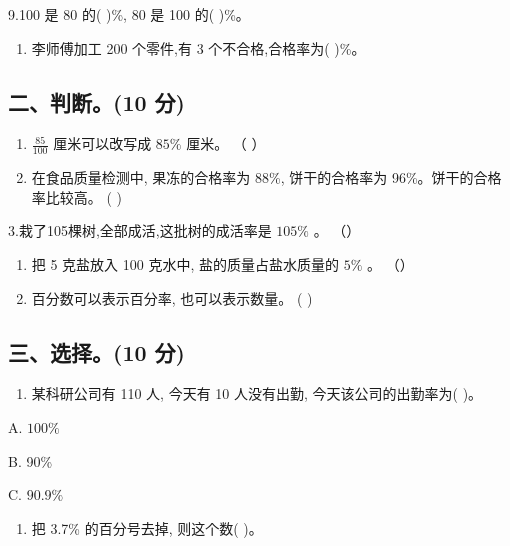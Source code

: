 \documentclass[
  10
]{article}
\providecommand{\tightlist}{%
  \setlength{\itemsep}{0pt}\setlength{\parskip}{0pt}}
\begin{document}
9.100 是 80 的( )\%, 80 是 100 的( )\%。

\begin{enumerate}
\def\labelenumi{\arabic{enumi}.}
\setcounter{enumi}{9}
\tightlist
\item
  李师傅加工 200 个零件,有 3 个不合格,合格率为( )\%。
\end{enumerate}

\subsection{二、判断。(10 分)}\label{ux4e8cux5224ux65ad10-ux5206}

\begin{enumerate}
\def\labelenumi{\arabic{enumi}.}
\item
  \(\frac{85}{100}\) 厘米可以改写成 \(85 \%\) 厘米。 （ ）
\item
  在食品质量检测中, 果冻的合格率为 88\%, 饼干的合格率为
  96\%。饼干的合格率比较高。 ( )
\end{enumerate}

3.栽了105棵树,全部成活,这批树的成活率是 \(105\%\) 。 （）

\begin{enumerate}
\def\labelenumi{\arabic{enumi}.}
\setcounter{enumi}{3}
\item
  把 5 克盐放入 100 克水中, 盐的质量占盐水质量的 \(5 \%\) 。 （）
\item
  百分数可以表示百分率, 也可以表示数量。 ( )
\end{enumerate}

\subsection{三、选择。(10 分)}\label{ux4e09ux9009ux62e910-ux5206}

\begin{enumerate}
\def\labelenumi{\arabic{enumi}.}
\tightlist
\item
  某科研公司有 110 人, 今天有 10 人没有出勤, 今天该公司的出勤率为( )。
\end{enumerate}

A. \(100\%\)

B. 90\%

C. \(90.9\%\)

\begin{enumerate}
\def\labelenumi{\arabic{enumi}.}
\setcounter{enumi}{1}
\tightlist
\item
  把 3.7\% 的百分号去掉, 则这个数( )。
\end{enumerate}
\end{document}
